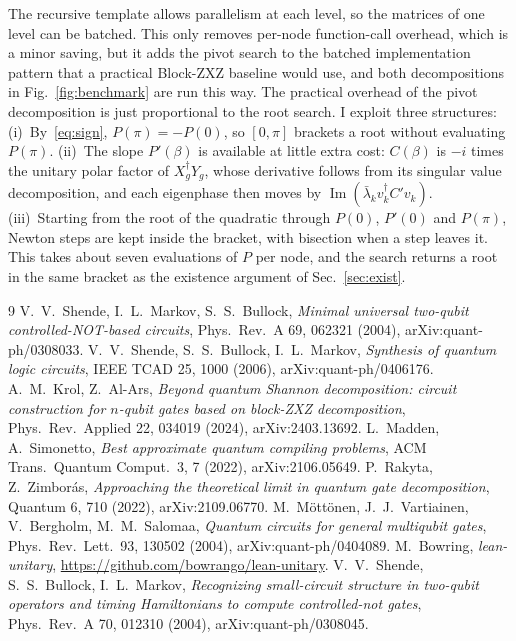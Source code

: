 \documentclass[11pt]{article}
\begin{document}
The recursive template allows parallelism at each level, so the matrices of one level can be
batched. This only removes per-node function-call overhead, which is a minor saving, but it adds the pivot
search to the batched implementation pattern that a practical Block-ZXZ baseline would use, and
both decompositions in Fig.~\ref{fig:benchmark} are run this way.
The practical overhead of the pivot decomposition is just proportional to the root search. I exploit three structures:
(i)~By~\eqref{eq:sign}, $P(\pi)=-P(0)$, so $[0,\pi]$ brackets a
root without evaluating $P(\pi)$. 
(ii)~The slope $P'(\beta)$ is available at little extra cost:
$C(\beta)$ is $-i$ times the unitary polar factor of $X_g^\dagger Y_g$, whose derivative follows
from its singular value decomposition, and each eigenphase then moves by
$\operatorname{Im}(\bar\lambda_k v_k^\dagger C' v_k)$. 
(iii)~Starting from the root of the quadratic
through $P(0)$, $P'(0)$ and $P(\pi)$, Newton steps are kept inside the bracket, with bisection
when a step leaves it. This takes about seven evaluations of $P$ per node, and the search
returns a root in the same bracket as the existence argument of Sec.~\ref{sec:exist}.

\begin{thebibliography}{9}
 V.~V.~Shende, I.~L.~Markov, S.~S.~Bullock, \emph{Minimal universal two-qubit
controlled-NOT-based circuits}, Phys.\ Rev.\ A 69, 062321 (2004), arXiv:quant-ph/0308033.
 V.~V.~Shende, S.~S.~Bullock, I.~L.~Markov, \emph{Synthesis of quantum logic
circuits}, IEEE TCAD 25, 1000 (2006), arXiv:quant-ph/0406176.
 A.~M.~Krol, Z.~Al-Ars, \emph{Beyond quantum Shannon decomposition: circuit
construction for $n$-qubit gates based on block-ZXZ decomposition}, Phys.\ Rev.\ Applied 22,
034019 (2024), arXiv:2403.13692.
 L.~Madden, A.~Simonetto, \emph{Best approximate quantum compiling problems},
ACM Trans.\ Quantum Comput.\ 3, 7 (2022), arXiv:2106.05649.
 P.~Rakyta, Z.~Zimbor\'as, \emph{Approaching the theoretical limit in quantum
gate decomposition}, Quantum 6, 710 (2022), arXiv:2109.06770.
 M.~M\"ott\"onen, J.~J.~Vartiainen, V.~Bergholm, M.~M.~Salomaa,
\emph{Quantum circuits for general multiqubit gates}, Phys.\ Rev.\ Lett.\ 93, 130502 (2004),
arXiv:quant-ph/0404089.
 M.~Bowring, \emph{lean-unitary}, \url{https://github.com/bowrango/lean-unitary}.
 V.~V.~Shende, S.~S.~Bullock, I.~L.~Markov, \emph{Recognizing small-circuit
structure in two-qubit operators and timing Hamiltonians to compute controlled-not gates}, Phys.\ Rev.\ A 70, 012310 (2004), arXiv:quant-ph/0308045.
\end{thebibliography}
\end{document}
